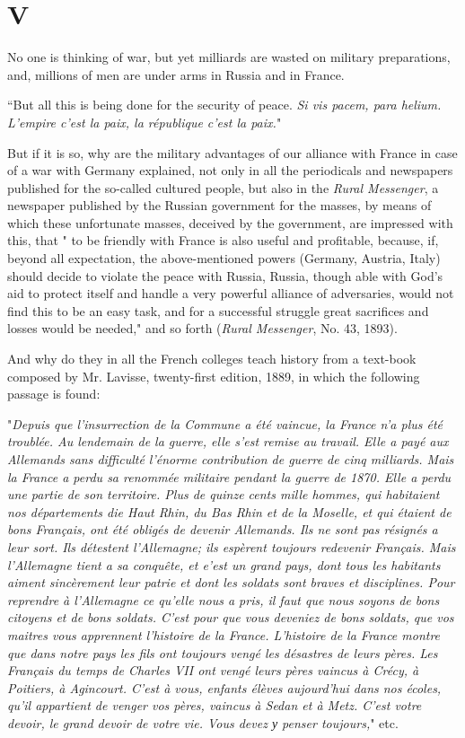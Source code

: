 \documentclass{book}
\begin{document}
\chapter{V}
\label{chapter-5}
No one is thinking of war, but yet milliards are wasted on military preparations, and, millions of men are under arms in Russia and in France.

“But all this is being done for the security of peace. \emph{Si vis pacem, para helium. L’empire c’est la paix, la république c’est la paix.}"

But if it is so, why are the military advantages of our alliance with France in case of a war with Germany explained, not only in all the periodicals and newspapers published for the so-called cultured people, but also in the \emph{Rural Messenger}, a newspaper published by the Russian government for the masses, by means of which these unfortunate masses, deceived by the government, are impressed with this, that " to be friendly with France is also useful and profitable, because, if, beyond all expectation, the above-mentioned powers (Germany, Austria, Italy) should decide to violate the peace with Russia, Russia, though able with God’s aid to protect itself and handle a very powerful alliance of adversaries, would not find this to be an easy task, and for a successful struggle great sacrifices and losses would be needed," and so forth (\emph{Rural Messenger}, No. 43, 1893).

And why do they in all the French colleges teach history from a text-book composed by Mr. Lavisse, twenty-first edition, 1889, in which the following passage is found:

"\emph{Depuis que l’insurrection de la Commune a été vaincue, la France n’a plus été troublée. Au lendemain de la guerre, elle s’est remise au travail. Elle a payé aux Allemands sans difficulté l’énorme contribution de guerre de cinq milliards. Mais la France a perdu sa renommée militaire pendant la guerre de 1870. Elle a perdu une partie de son territoire. Plus de quinze cents mille hommes, qui habitaient nos départements die Haut Rhin, du Bas Rhin et de la Moselle, et qui étaient de bons Français, ont été obligés de devenir Allemands. Ils ne sont pas résignés a leur sort. Ils détestent l’Allemagne; ils espèrent toujours redevenir Français. Mais l’Allemagne tient a sa conquête, et e’est un grand pays, dont tous les habitants aiment sincèrement leur patrie et dont les soldats sont braves et disciplines. Pour reprendre à l’Allemagne ce qu’elle nous a pris, il faut que nous soyons de bons citoyens et de bons soldats. C’est pour que vous deveniez de bons soldats, que vos maitres vous apprennent l’histoire de la France. L’histoire de la France montre que dans notre pays les fils ont toujours vengé les désastres de leurs pères. Les Français du temps de Charles VII ont vengé leurs pères vaincus à Crécy, à Poitiers, à Agincourt. C’est à vous, enfants élèves aujourd’hui dans nos écoles, qu’il appartient de venger vos pères, vaincus à Sedan et à Metz. C’est votre devoir, le grand devoir de votre vie. Vous devez у penser toujours,}" etc.
\end{document}
